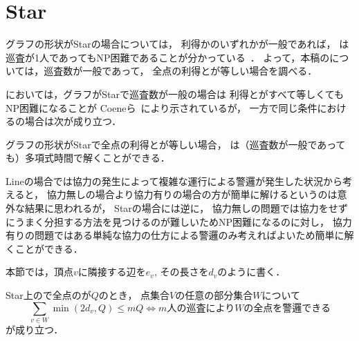 \section{Star}
\label{section: star}

グラフの形状がStarの場合については，
利得か{\idletime}のいずれかが一般であれば，
{\patProb}は巡査が1人であってもNP困難であることが分かっている~\cite{coene2011charlemagne}．
よって，本稿の{\patProb}については，巡査数が一般であって，
全点の利得と{\idletime}が等しい場合を調べる．

{\assignedPatProb}においては，グラフがStarで巡査数が一般の場合は
利得と{\idletime}がすべて等しくてもNP困難になることが
Coeneら~\cite{coene2011charlemagne}により示されているが，
一方で同じ条件における{\patProb}の場合は次が成り立つ．

\begin{theo}
  \label{theo:StarEqualProfitTimelimit}
  グラフの形状がStarで全点の利得と{\idletime}が等しい場合，
  {\patProb}は（巡査数が一般であっても）多項式時間で解くことができる．
\end{theo}


Lineの場合では協力の発生によって複雑な運行による警邏が発生した状況から考えると，
協力無しの場合より協力有りの場合の方が簡単に解けるというのは意外な結果に思われるが，
Starの場合には逆に，
協力無しの問題では協力をせずにうまく分担する方法を見つけるのが難しいためNP困難になるのに対し，
協力有りの問題ではある単純な協力の仕方による警邏のみ考えればよいため簡単に解くことができる．


本節では，頂点$v$に隣接する辺を$e_v$, その長さを$d_v$のように書く．

\begin{lemm}
  \label{lemm:condition_of_guarding_star}
  Star上の{\patProb}で全点の{\idletime}が$Q$のとき，
  点集合$V$の任意の部分集合$W$について
  $$
    \sum_{v \in W} \min(2d_v, Q) \leq mQ
    \iff \text{$m$人の巡査により$W$の全点を警邏できる}
  $$
  が成り立つ．
\end{lemm}





